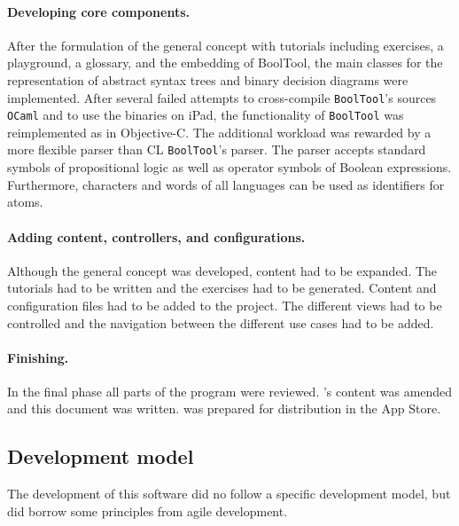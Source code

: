 \paragraph{Developing core components.}


After the formulation of the general concept with tutorials including 
exercises, a playground, a glossary, and the embedding of BoolTool,
the main classes for the representation of abstract syntax trees and binary decision diagrams were implemented.
After several failed attempts to cross-compile \verb=BoolTool='s sources \verb+OCaml+ 
and to use the binaries on iPad, the functionality of \verb+BoolTool+ was reimplemented as \BoolTool in Objective-C.
The additional workload was rewarded by a more flexible parser than CL \verb+BoolTool+’s parser.
The parser accepts standard symbols of propositional logic as well as operator symbols of Boolean expressions.
Furthermore, characters and words of all languages can be used as identifiers for atoms.

\paragraph{Adding content, controllers, and configurations.}

Although the general concept was developed, content had to be expanded. 
The tutorials had to be written and the exercises had to be generated. 
Content and configuration files had to be added to the project. 
The different views had to be controlled and the navigation between the different use cases had to be added. 

\paragraph{Finishing.} In the final phase all parts of the program were reviewed.
\Nyaya's content was amended and this document was written. 
\Nyaya was prepared for distribution in the App Store.

\subsection{Development model}

The development of this software did no follow a specific development model, 
but did borrow some principles from agile development.

